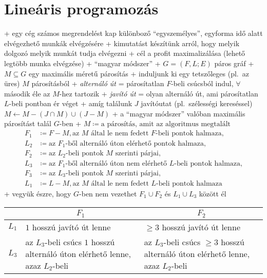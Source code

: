 
\section{Lineáris programozás}


+ \example egy cég számos megrendelést kap különboző ``egyszemélyes'',
  egyforma idő alatt elvégezhető munkák elvégzésére
  + kimutatást készítünk arról, hogy melyik dolgozó melyik munkát
    tudja elvégezni
  + cél a profit maximalizálása (lehető legtöbb munka elvégzése)
+ \alg ``magyar módszer''
  + \DataIn $G = (F, L; E)$ páros gráf
  + \DataOut $M \subseteq G$ egy maximális méretű párosítás
  + induljunk ki egy tetszőleges (pl.~az üres) $M$ párosításból
  + \emph{alternáló út} = párosítatlan $F$-beli csúcsból indul, $\forall$
    második éle az $M$-hez tartozik
    + \emph{javító út} = olyan alternáló út, ami párosítatlan $L$-beli
      pontban ér véget
  + amíg találunk $J$ javítóutat (pl.~szélességi kereséssel) \RA $M
    \gets M - (J \cap M) \cup (J - M)$
+ \thm \label{thm:linprog:egervary:magyar}a ``magyar módszer'' valóban maximális párosítást talál
  $G$-ben
  + \proof $M \coloneqq \text{a párosítás, amit az algoritmus
    megtalált}$
  \begin{align*}
    F_1 &\coloneqq F - M, \text{az $M$ által le nem fedett $F$-beli
          pontok halmaza,}\\
    L_2 &\coloneqq \text{az $F_1$-ből alternáló úton elérhető pontok
          halmaza,} \\
    F_2 &\coloneqq \text{az $L_2$-beli pontok $M$ szerinti párjai,} \\
    L_3 &\coloneqq \text{az $F_1$-ből alternáló úton nem elérhető
          $L$-beli pontok halmaza,} \\
    F_3 &\coloneqq \text{az $L_3$-beli pontok $M$ szerinti párjai,} \\
    L_1 &\coloneqq L - M, \text{az $M$ által le nem fedett $L$-beli pontok
          halmaza}
  \end{align*}
  + vegyük észre, hogy $G$-ben nem vezethet $F_1 \cup F_2$ és $L_1
    \cup L_3$ között él
    \par
    {\centering\begin{tabular}{c|p{6cm}|p{6cm}}
      & \multicolumn{1}{c|}{$F_1$} & \multicolumn{1}{c}{$F_2$} \\\hline
      $L_1$ & $1$ hosszú javító út lenne & $\ge 3$ hosszú javító út lenne \\\hline
      $L_3$ & az $L_3$-beli csúcs $1$ hosszú alternáló úton elérhető lenne, azaz $L_2$-beli
            & az $L_3$-beli csúcs $\ge 3$ hosszú alternáló úton elérhető lenne, azaz $L_2$-beli
    \end{tabular}\par}
